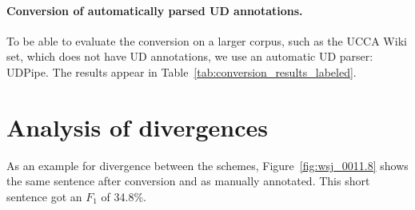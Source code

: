 \documentclass[11pt,a4paper]{article}
\begin{document}
\paragraph{Conversion of automatically parsed UD annotations.}

To be able to evaluate the conversion on a larger corpus,
such as the UCCA Wiki set, which does not have UD annotations,
we use an automatic UD parser: UDPipe.
The results appear in Table~\ref{tab:conversion_results_labeled}.


%


\section{Analysis of divergences}\label{sec:analysis}



As an example for divergence between the schemes, Figure~\ref{fig:wsj_0011.8} shows
the same sentence after conversion and as manually annotated.
This short sentence got an $F_1$ of 34.8\%.
\end{document}
